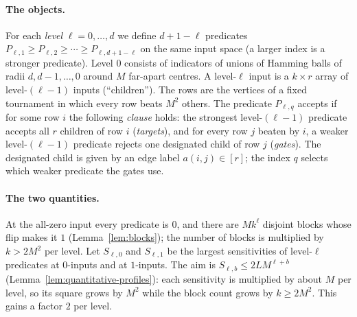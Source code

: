 \documentclass[11pt]{article}
\theoremstyle{definition}
\theoremstyle{remark}
\begin{document}
\paragraph{The objects.}
For each \emph{level} \(\ell=0,\ldots,d\) we define \(d+1-\ell\) predicates
\(P_{\ell,1}\ge P_{\ell,2}\ge\cdots\ge P_{\ell,d+1-\ell}\) on the same input space (a larger index is a stronger predicate).
Level \(0\) consists of indicators of unions of Hamming balls of radii \(d,d-1,\ldots,0\) around \(M\) far-apart centres.
A level-\(\ell\) input is a \(k\times r\) array of level-\((\ell-1)\) inputs (``children'').
The rows are the vertices of a fixed tournament in which every row beats \(M^2\) others.
The predicate \(P_{\ell,q}\) accepts if for some row \(i\) the following \emph{clause} holds: the strongest level-\((\ell-1)\) predicate accepts all \(r\) children of row \(i\) (\emph{targets}), and for every row \(j\) beaten by \(i\), a weaker level-\((\ell-1)\) predicate rejects one designated child of row \(j\) (\emph{gates}).
The designated child is given by an edge label \(a(i,j)\in[r]\); the index \(q\) selects which weaker predicate the gates use.

\paragraph{The two quantities.}
At the all-zero input every predicate is \(0\), and there are \(Mk^\ell\) disjoint blocks whose flip makes it \(1\) (Lemma~\ref{lem:blocks}); the number of blocks is multiplied by \(k>2M^2\) per level.
Let \(S_{\ell,0}\) and \(S_{\ell,1}\) be the largest sensitivities of level-\(\ell\) predicates at \(0\)-inputs and at \(1\)-inputs.
The aim is \(S_{\ell,b}\le2LM^{\ell+b}\) (Lemma~\ref{lem:quantitative-profiles}): each sensitivity is multiplied by about \(M\) per level, so its square grows by \(M^2\) while the block count grows by \(k\ge2M^2\).
This gains a factor \(2\) per level.
\end{document}
